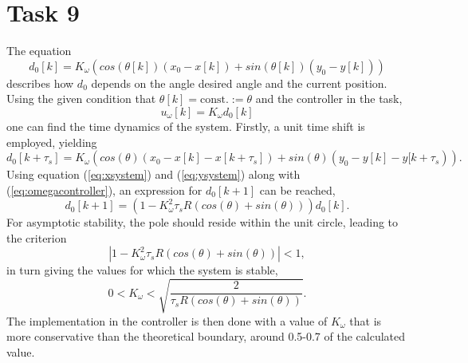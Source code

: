 \documentclass[a4paper,12pt,oneside,onecolumn]{article} %
\begin{document}
\section*{Task 9}
The equation 
	\begin{equation}
		\label{eq:omegasystem}
		d_0[k] = K_\omega(cos(\theta[k])(x_0-x[k]) + sin(\theta[k])(y_0-y[k]))
	\end{equation}
 	describes how $d_0$ depends on the angle desired angle and the current position. Using the given condition that $\theta[k] = \text{const.} := \theta$ and the controller in the task,
\begin{equation}
\label{eq:omegacontroller}
 	u_\omega [k] = K_\omega d_0 [k]
\end{equation} 	 
one can find the time dynamics of the system. Firstly, a unit time shift is employed, yielding
\begin{equation}
		d_0[k+\tau_s] = K_\omega(cos(\theta)(x_0-x[k]-x[k+\tau_s]) + sin(\theta)(y_0-y[k] - y[k+\tau_s)).
\end{equation}
Using equation (\ref{eq:xsystem}) and (\ref{eq:ysystem}) along with (\ref{eq:omegacontroller}), an expression for $d_0[k+1]$ can be reached,
\begin{equation}
d_0[k+1] = \left( 1 - K_\omega^2 \tau_s R (cos(\theta) + sin(\theta)) \right) d_0[k].
\end{equation}
For asymptotic stability, the pole should reside within the unit circle, leading to the criterion
\begin{equation}
\left|1 - K_\omega^2 \tau_s R (cos(\theta) + sin(\theta)) \right| <1,
\end{equation}
in turn giving the values for which the system is stable,
\begin{equation}
0 < K_\omega < \sqrt{\frac{2}{\tau_s R (cos(\theta) + sin(\theta))}}.
\end{equation}
The implementation in the controller is then done with a value of $K_\omega$ that is more conservative than the theoretical boundary, around 0.5-0.7 of the calculated value.
\end{document}
